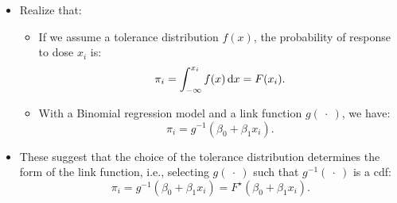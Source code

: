 \documentclass{article}\usepackage[]{graphicx}\usepackage[svgnames]{xcolor}
\begin{document}
\begin{itemize}
      \item Realize that:
            \begin{itemize}
                  \item If we assume a tolerance distribution $ f(x) $, the probability of response to dose $ x_i $ is:
                        \[ \pi_i=\int_{-\infty}^{x_i}f(x)\odif{x} =F(x_i). \]
                  \item With a Binomial regression model and a link function $ g(\:\cdot\:) $, we have:
                        \[ \pi_i=g^{-1}(\beta_0+\beta_1x_i). \]
            \end{itemize}
      \item These suggest that the choice of the tolerance distribution determines the form of the link function, i.e., selecting
            $ g(\:\cdot\:) $ such that $ g^{-1}(\:\cdot\:) $ is a cdf:
            \[ \pi_i=g^{-1}(\beta_0+\beta_1x_i)=F^\star(\beta_0+\beta_1x_i). \]
\end{itemize}
\end{document}
